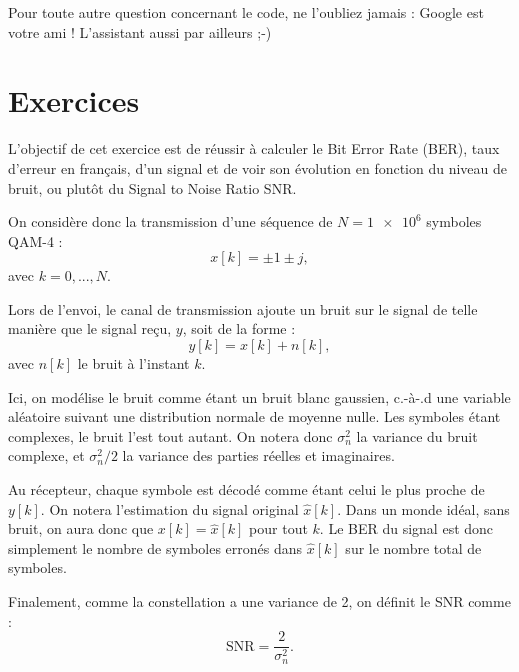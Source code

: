 \documentclass [a4paper, 11pt] {article}
\begin{document}
    Pour toute autre question concernant le code, ne l'oubliez jamais : Google est votre ami ! L'assistant aussi par ailleurs ;-)
    
    \pagebreak
    \pagestyle{nextpages}
    \part*{Exercices}
    
    \begin{exercice}{1}
    
        L'objectif de cet exercice est de réussir à calculer le Bit Error Rate (BER), taux d'erreur en français, d'un signal et de voir son évolution en fonction du niveau de bruit, ou plutôt du Signal to Noise Ratio SNR.
        
        On considère donc la transmission d'une séquence de $N=\num{1e6}$ symboles QAM-4 :
        \begin{equation}
            x[k] = \pm 1 \pm j,
        \end{equation}
        avec $k=0,...,N$.
        
        Lors de l'envoi, le canal de transmission ajoute un bruit sur le signal de telle manière que le signal reçu, $y$, soit de la forme :
        \begin{equation}
            y[k] = x[k] + n[k],
        \end{equation}
        avec $n[k]$ le bruit à l'instant $k$.
        
        Ici, on modélise le bruit comme étant un bruit blanc gaussien, c.-à-.d une variable aléatoire suivant une distribution normale de moyenne nulle. Les symboles étant complexes, le bruit l'est tout autant. On notera donc $\sigma_n^2$ la variance du bruit complexe, et $\sigma_n^2/2$ la variance des parties réelles et imaginaires.
        
        Au récepteur, chaque symbole est décodé comme étant celui le plus proche de $y[k]$. On notera l'estimation du signal original $\hat{x}[k]$. Dans un monde idéal, sans bruit, on aura donc que $x[k]=\hat{x}[k]$ pour tout $k$. Le BER du signal est donc simplement le nombre de symboles erronés dans $\hat{x}[k]$ sur le nombre total de symboles.
        
        Finalement, comme la constellation a une variance de 2, on définit le SNR comme :
        \begin{equation}
            \text{SNR} = \frac{2}{\sigma_n^2}.
        \end{equation}
        

\end{exercice}
\end{document}
